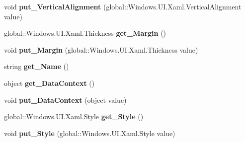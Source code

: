 \begin{DoxyCompactItemize}
void {\bfseries put\+\_\+\+Vertical\+Alignment} (global\+::\+Windows.\+U\+I.\+Xaml.\+Vertical\+Alignment value)
\item 
\mbox{\label{interface_windows_1_1_u_i_1_1_xaml_1_1_i_framework_element_a4b7dbc2a4b60e47ea9bfe8bc5ee3ad33}} 
global\+::\+Windows.\+U\+I.\+Xaml.\+Thickness {\bfseries get\+\_\+\+Margin} ()
\item 
\mbox{\label{interface_windows_1_1_u_i_1_1_xaml_1_1_i_framework_element_a38f9babd2b0b51bb24956c953463c95b}} 
void {\bfseries put\+\_\+\+Margin} (global\+::\+Windows.\+U\+I.\+Xaml.\+Thickness value)
\item 
\mbox{\label{interface_windows_1_1_u_i_1_1_xaml_1_1_i_framework_element_a1e142daabb976702923de9dd5bad0e79}} 
string {\bfseries get\+\_\+\+Name} ()
\item 
\mbox{\label{interface_windows_1_1_u_i_1_1_xaml_1_1_i_framework_element_a85f9478adc486dc6da6301bf424b0bec}} 
object {\bfseries get\+\_\+\+Data\+Context} ()
\item 
\mbox{\label{interface_windows_1_1_u_i_1_1_xaml_1_1_i_framework_element_a61847908f27c9feb7e9307fccd243aa7}} 
void {\bfseries put\+\_\+\+Data\+Context} (object value)
\item 
\mbox{\label{interface_windows_1_1_u_i_1_1_xaml_1_1_i_framework_element_a8acb2f4d3cfe85560c75cdba3730e2dc}} 
global\+::\+Windows.\+U\+I.\+Xaml.\+Style {\bfseries get\+\_\+\+Style} ()
\item 
\mbox{\label{interface_windows_1_1_u_i_1_1_xaml_1_1_i_framework_element_ab113b23a88312132f12dd7ff37c23fc2}} 
void {\bfseries put\+\_\+\+Style} (global\+::\+Windows.\+U\+I.\+Xaml.\+Style value)
\item 
\mbox{\label{interface_windows_1_1_u_i_1_1_xaml_1_1_i_framework_element_a109f23b5d4ff91a61e010793e8f75ef6}} 

\end{DoxyCompactItemize}

